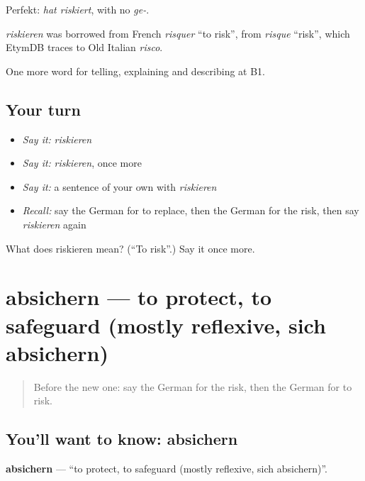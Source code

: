 Perfekt: \emph{hat riskiert}, with no \emph{ge-}.

\begin{cousinweb}
\emph{riskieren} was borrowed from French \emph{risquer} \textquotedblleft{}to risk\textquotedblright{}, from \emph{risque} \textquotedblleft{}risk\textquotedblright{}, which EtymDB traces to Old Italian \emph{risco}.
\end{cousinweb}

\begin{grammarlens}[title={What you've built}]
One more word for telling, explaining and describing at B1.
\end{grammarlens}

\subsection*{Your turn}
\begin{itemize}
\raggedright
  \item \emph{Say it:} \emph{riskieren}
  \item \emph{Say it:} \emph{riskieren}, once more
  \item \emph{Say it:} a sentence of your own with \emph{riskieren}
  \item \emph{Recall:} say the German for to replace, then the German for the risk, then say \emph{riskieren} again
\end{itemize}

\begin{tcolorbox}[breakable,colback=teal!4,colframe=teal!35!black,title={Before you move on}]
What does riskieren mean? (\textquotedblleft{}To risk\textquotedblright{}.) Say it once more.
\end{tcolorbox}
\section[absichern]{absichern — to protect, to safeguard (mostly reflexive, sich absichern)}

\label{lesson:GE-C369-absichern}



\begin{quote}
Before the new one: say the German for the risk, then the German for to risk.
\end{quote}

\subsection*{You'll want to know: absichern}
\textbf{absichern} — \textquotedblleft{}to protect, to safeguard (mostly reflexive, sich absichern)\textquotedblright{}.

